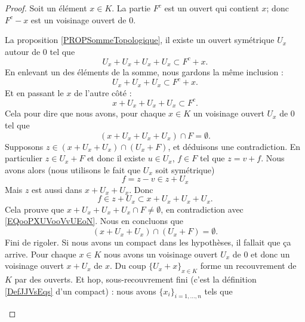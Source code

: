 \begin{proof}
	Soit un élément \( x\in K\). La partie \( F^c\) est un ouvert qui contient \( x\); donc \( F^c-x\) est un voisinage ouvert de \( 0\).

	\begin{subproof}
		La proposition \ref{PROPSommeTopologique}, il existe un ouvert symétrique \( U_x\) autour de \( 0\) tel que
		\begin{equation}
			U_x+U_x+U_x+U_x\subset F^c+x.
		\end{equation}
		En enlevant un des éléments de la somme, nous gardons la même inclusion :
		\begin{equation}
			U_x+U_x+U_x\subset F^c+x.
		\end{equation}
		Et en passant le \( x\) de l'autre côté :
		\begin{equation}
			x+U_x+U_x+U_x\subset F^c.
		\end{equation}
		Cela pour dire que nous avons, pour chaque \( x\in K\) un voisinage ouvert \( U_x\) de \( 0\) tel que
		\begin{equation}        \label{EQooPXUVooVvUEoN}
			(x+U_x+U_x+U_x)\cap F=\emptyset.
		\end{equation}
		\spitem[\( (x+U_x+U_x)\cap (U_x+F)=\emptyset\)]
		Supposons \( z\in (x+U_x+U_x)\cap (U_x+F)\), et déduisons une contradiction. En particulier \( z\in U_x+F\) et donc il existe \( u\in U_x\), \( f\in F\) tel que \( z=v+f\). Nous avons alors (nous utilisons le fait que \( U_x\) soit symétrique)
		\begin{equation}
			f=z-v\in z+U_x
		\end{equation}
		Mais \( z\) est aussi dans \( x+U_x+U_x\). Donc
		\begin{equation}
			f\in z+U_x\subset x+U_x+U_x+U_x.
		\end{equation}
		Cela prouve que \( x+U_x+U_x+U_x\cap F\neq \emptyset\), en contradiction avec \eqref{EQooPXUVooVvUEoN}. Nous en concluons que
		\begin{equation}        \label{EQooNLCRooWTEoye}
			(x+U_x+U_x)\cap (U_x+F)=\emptyset.
		\end{equation}
		Fini de rigoler. Si nous avons un compact dans les hypothèses, il fallait que ça arrive. Pour chaque \( x\in K\) nous avons un voisinage ouvert \( U_x\) de \( 0\) et donc un voisinage ouvert \( x+U_x\) de \( x\). Du coup \( \{ U_x+x \}_{x\in K}\) forme un recouvrement de \( K\) par des ouverts. Et hop, sous-recouvrement fini (c'est la définition \ref{DefJJVsEqs} d'un compact) : nous avons \( \{ x_i \}_{i=1,\ldots, n}\) tels que

\end{subproof}
\end{proof}
